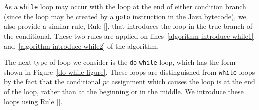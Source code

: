 As a \texttt{while} loop may occur with the loop at the end of either
condition branch (since the loop may be created by a \texttt{goto}
instruction in the Java bytecode), we also provide a similar rule,
Rule [], that introduces the loop in the
true branch of the conditional.
These two rules are applied on lines~\ref{algorithm-introduce-while1}
and~\ref{algorithm-introduce-while2} of the algorithm.

The next type of loop we consider is the \texttt{do}-\texttt{while}
loop, which has the form shown in Figure~\ref{do-while-figure}.
These loops are distinguished from \texttt{while} loops by the fact
that the conditional $pc$ assignment which causes the loop is at the
end of the loop, rather than at the beginning or in the middle.
We introduce these loops using Rule
[].
